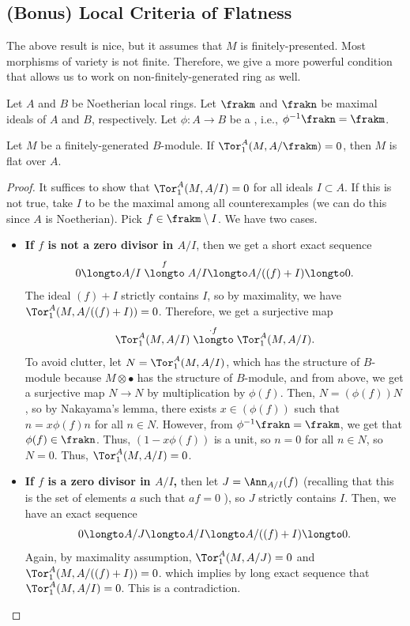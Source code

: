 \subsection{(Bonus) Local Criteria of Flatness}
The above result is nice, but it assumes that $M$
is finitely-presented. 
Most morphisms of variety is not finite.
Therefore, we give a more powerful condition 
that allows us to work on non-finitely-generated ring as well.
\begin{theorem}
Let $A$ and $B$ be Noetherian local rings.
Let $\frakm$ and $\frakn$ be maximal ideals of 
$A$ and $B$, respectively.
Let $\phi : A\to B$ be a ,
i.e., $\phi^{-1}\frakn = \frakm$.

Let $M$ be a finitely-generated $B$-module.
If $\Tor_1^A(M,A/\frakm) = 0$,
then $M$ is flat over $A$.
\end{theorem}
\begin{proof}
    It suffices to show that $\Tor_1^A(M,A/I)=0$
    for all ideals $I\subset A$. 
    If this is not true, take $I$ to be the maximal
    among all counterexamples
    (we can do this since $A$ is Noetherian).
    Pick $f\in\frakm\setminus I$. We have two cases. 
    \begin{itemize}
	\item \textbf{If $f$ is not a zero divisor in $A/I$},
    then we get a short exact sequence
    $$0\longto A/I\stackrel{f}\longto A/I
    \longto A/((f)+I)\longto 0.$$
    The ideal $(f)+I$ strictly contains $I$,
    so by maximality, we have $\Tor_1^A(M,A/((f)+I)) = 0$.
    Therefore, we get a surjective map
    $$\Tor_1^A(M,A/I) \stackrel{\cdot f}\longto \Tor_1^A(M,A/I).$$
    To avoid clutter, let $N=\Tor_1^A(M,A/I)$,
    which has the structure of $B$-module 
    because $M\otimes \bullet$ has the structure
    of $B$-module,
    and from above, we get a surjective map
    $N\to N$ by multiplication by $\phi(f)$.
    Then, $N=(\phi(f))N$, so by Nakayama's lemma,
    there exists $x\in (\phi(f))$ such that 
    $n = x\phi(f)n$ for all $n\in N$.
    However, from $\phi^{-1}\frakn = \frakm$, we get that
    $\phi(f)\in \frakn$. Thus, $(1-x\phi(f))$ is a unit,
    so $n=0$ for all $n\in N$, so $N=0$.
    Thus, $\Tor_1^A(M,A/I)=0$.
    \item \textbf{If $f$ is a zero divisor in $A/I$,}
    then let $J = \Ann_{A/I}(f)$ (recalling that this is the 
    set of elements $a$ such that $af=0$ 
    ), so $J$ strictly contains $I$.
    Then, we have an exact sequence
    $$0\longto A/J\longto A/I\longto A/((f)+I) \longto 0.$$
    Again, by maximality assumption,
    $\Tor_1^A(M,A/J)=0$ and $\Tor_1^A(M,A/((f)+I))=0$.
    which implies by long exact sequence that 
    $\Tor_1^A(M,A/I)=0$.
    This is a contradiction. \qedhere
    \end{itemize}
\end{proof}
